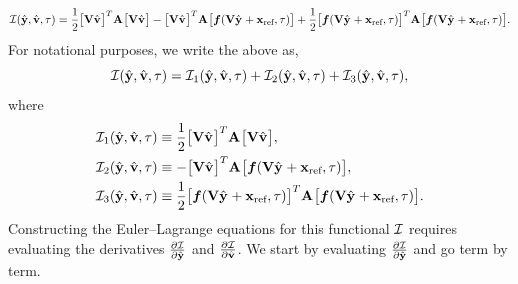 \documentclass[3p,computermodern,10pt]{elsarticle}
\begin{document}
\begin{appendices}
\begin{equation}
 \mathcal{I}(\hat{\mathbf{y}},\hat{\mathbf{v}},\tau)  = \frac{1}{2}\big[\mathbf {V} \hat{\mathbf{v}}^{}  \big]^T  \mathbf{A}^{}  \big[ \mathbf {V} \hat{\mathbf{v}}^{} \big]  -  \big[ \mathbf {V} \hat{\mathbf{v}}^{} \big]^T \mathbf{A}^{} \big[ \boldsymbol f(\mathbf {V} \hat{\mathbf{y}}^{} + \mathbf{x}_\text{ref},\tau) \big]  + \frac{1}{2}\big[\boldsymbol f(\mathbf {V} \hat{\mathbf{y}}^{} + \mathbf{x}_\text{ref},\tau) \big]^T \mathbf{A}^{} \big[ \boldsymbol f(\mathbf {V} \hat{\mathbf{y}}^{} + \mathbf{x}_\text{ref},\tau) \big].
\end{equation}
For notational purposes, we write the above as,
$$  \mathcal{I}(\hat{\mathbf{y}},\hat{\mathbf{v}},\tau) =  \mathcal{I}_1(\hat{\mathbf{y}},\hat{\mathbf{v}},\tau) +  \mathcal{I}_2(\hat{\mathbf{y}},\hat{\mathbf{v}},\tau) +  \mathcal{I}_3(\hat{\mathbf{y}},\hat{\mathbf{v}},\tau),$$
where
\begin{align*}
&\mathcal{I}_1(\hat{\mathbf{y}},\hat{\mathbf{v}},\tau) \equiv  \frac{1}{2}\big[\mathbf {V} \hat{\mathbf{v}}^{}  \big]^T  \mathbf{A}^{}  \big[ \mathbf {V} \hat{\mathbf{v}}^{} \big], \\
&   \mathcal{I}_2(\hat{\mathbf{y}},\hat{\mathbf{v}},\tau) \equiv   -  \big[ \mathbf {V} \hat{\mathbf{v}}^{} \big]^T \mathbf{A}^{} \big[ \boldsymbol f(\mathbf {V} \hat{\mathbf{y}}^{} + \mathbf{x}_\text{ref},\tau) \big], \\
&  \mathcal{I}_3(\hat{\mathbf{y}},\hat{\mathbf{v}},\tau) \equiv  \frac{1}{2}\big[\boldsymbol f(\mathbf {V} \hat{\mathbf{y}}^{} + \mathbf{x}_\text{ref},\tau) \big]^T \mathbf{A}^{} \big[ \boldsymbol f(\mathbf {V} \hat{\mathbf{y}}^{} + \mathbf{x}_\text{ref},\tau) \big] . 
\end{align*}
Constructing the Euler--Lagrange equations for this functional $\mathcal{I}$ requires evaluating the derivatives $\frac{\partial \mathcal{I}}{\partial \hat{\mathbf{y}}}$ and $\frac{\partial \mathcal{I}}{\partial \hat{\mathbf{v}}}$. We start by evaluating $\frac{\partial \mathcal{I}}{\partial \hat{\mathbf{y}}}$ and go term by term.


\end{appendices}
\end{document}
